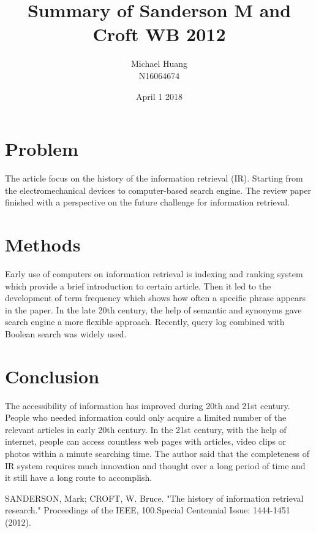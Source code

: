 \documentclass{article}
\title{Summary of Sanderson M and Croft WB 2012}
\author{Michael Huang \\N16064674 }
\date{April 1 2018}
\begin{document}
\maketitle

\section{Problem}
The article focus on the history of the information retrieval (IR). Starting from the electromechanical devices to computer-based search engine. The review paper finished with a perspective on the future challenge for information retrieval.
\section{Methods}
Early use of computers on information retrieval is indexing and ranking system which provide a brief introduction to certain article. Then it led to the development of term frequency which shows how often a specific phrase appears in the paper. In the late 20th century, the help of semantic and synonyms gave search engine a more flexible approach. Recently, query log combined with Boolean search was widely used.
\section{Conclusion}
The accessibility of information has improved during 20th and 21st century. People who needed information could only acquire a limited number of the relevant articles in early 20th century. In the 21st century, with the help of internet, people can access countless web pages with articles, video clips or photos within a minute searching time. The author said that the completeness of IR system requires much innovation and thought over a long period of time and it still have a long route to accomplish.




\begin{thebibliography}{99}

SANDERSON, Mark; CROFT, W. Bruce. "The history of information retrieval research." 
Proceedings of the IEEE, 100.Special Centennial Issue: 1444-1451 (2012).



\end{thebibliography}
\end{document}
